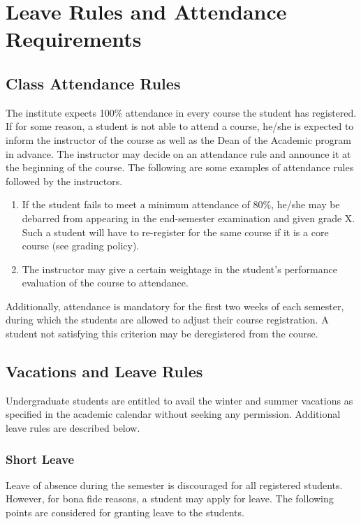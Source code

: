 \section{Leave Rules and Attendance Requirements}

\subsection{Class Attendance Rules}

The institute expects 100\% attendance in every course the student has registered. If for some reason, a student is not able to attend a course, he/she is expected to inform the instructor of the course as well as the Dean of the Academic program in advance. The instructor may decide on an attendance rule and announce it at the beginning of the course. The following are some examples of attendance rules followed by the instructors.

\begin{enumerate}
    \item If the student fails to meet a minimum attendance of 80\%, he/she may be debarred from appearing in the end-semester examination and given grade X. Such a student will have to re-register for the same course if it is a core course (see grading policy).
    \item The instructor may give a certain weightage in the student’s performance evaluation of the course to attendance.
\end{enumerate}

Additionally, attendance is mandatory for the first two weeks of each semester, during which the students are allowed to adjust their course registration. A student not satisfying this criterion may be deregistered from the course.

\subsection{Vacations and Leave Rules}

Undergraduate students are entitled to avail the winter and summer vacations as specified in the academic calendar without seeking any permission. Additional leave rules are described below.

\subsubsection{Short Leave}

Leave of absence during the semester is discouraged for all registered students. However, for bona fide reasons, a student may apply for leave. The following points are considered for granting leave to the students.

